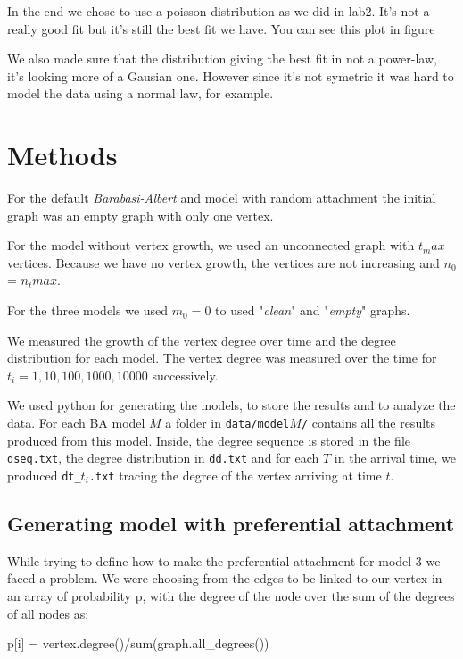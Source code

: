 \documentclass{article}
\begin{document}
In the end we chose to use a poisson distribution as we did in lab2. It's not a
really good fit but it's still the best fit we have. You can see this plot in
figure

We also made sure that the distribution giving the best fit in not a power-law,
it's looking more of a Gausian one. However since it's not symetric it was hard
to model the data using a normal law, for example.

\section{Methods} \label{methods}

For the default \textit{Barabasi-Albert} and model with random attachment the
initial graph was an empty graph with only one vertex.

For the model without vertex growth, we used an unconnected graph with $t_max$
vertices. Because we have no vertex growth, the vertices are not increasing and
$n_0$ = $n_tmax$.

For the three models we used $m_0 = 0$ to used "\textit{clean}" and
"\textit{empty}" graphs.

We measured the growth of the vertex degree over time and the degree
distribution for each model. The vertex degree was measured over the time for
$t_i = 1, 10, 100, 1000, 10000$ successively.

We used python for generating the models, to store the results and to analyze
the data. For each BA model $M$ a folder in \texttt{data/model$M$/} contains all
the results produced from this model. Inside, the degree sequence is stored in
the file \texttt{dseq.txt}, the degree distribution in \texttt{dd.txt} and for
each $T$ in the arrival time, we produced \texttt{dt\_$t_i$.txt} tracing the
degree of the vertex arriving at time $t$.

\subsection{Generating model with preferential attachment}

While trying to define how to make the preferential attachment for model 3 we
faced a problem. We were choosing from the edges to be linked to our vertex in
an array of probability p, with the degree of the node over the sum of the
degrees of all nodes as:

\begin{python}
    p[i] = vertex.degree()/sum(graph.all_degrees())
\end{python}
\end{document}
